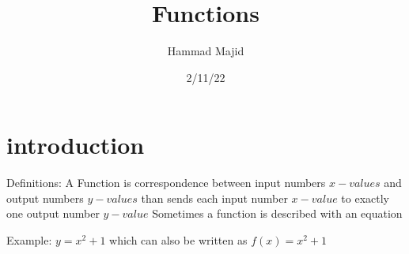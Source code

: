 \documentclass{article}
\title{Functions}
\author{Hammad Majid}
\date{2/11/22}
\begin{document}
\maketitle

\section{introduction}

Definitions: A Function is correspondence between input  numbers $x-values$ and output numbers $y-values$ than sends each input number $x-value$ to exactly one output number $y-value$
Sometimes a function is described with an equation

Example: $y = x^2 + 1$ which can also be written as $f(x) = x^2 + 1$
\end{document}
